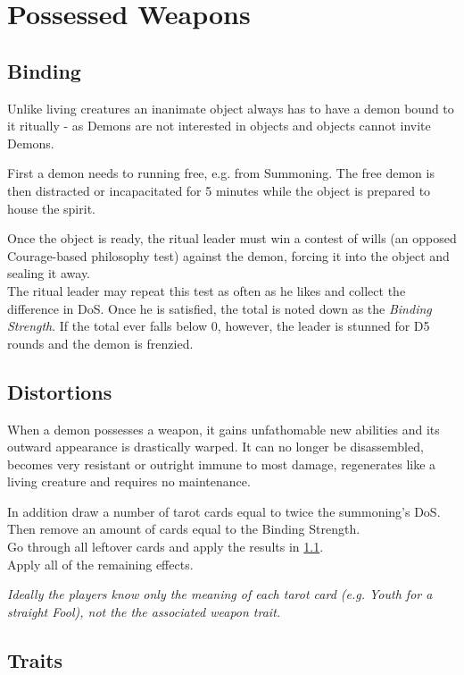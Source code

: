 \section{Possessed Weapons}
\label{sec:possessedweapon}
\subsection*{Binding}
Unlike living creatures an inanimate object always has to have a demon bound to it ritually
- as Demons are not interested in objects and objects cannot invite Demons.
\par
First a demon needs to running free, e.g. from Summoning.
The free demon is then distracted or incapacitated for 5 minutes while the object is prepared to house the spirit.
\par
Once the object is ready, the ritual leader must win a contest of wills
	(an opposed Courage-based philosophy test)
	against the demon, forcing it into the object and sealing it away.
\\%
The ritual leader may repeat this test as often as he likes and collect the difference in DoS.
Once he is satisfied, the total is noted down as the \emph{Binding Strength}.
If the total ever falls below 0, however, the leader is stunned for D5 rounds and the demon is frenzied.

\subsection*{Distortions}
When a demon possesses a weapon, it gains unfathomable new abilities and its outward appearance is drastically warped.
It can no longer be disassembled, becomes very resistant or outright immune to most damage, regenerates like a living creature and requires no maintenance.
\par
In addition draw a number of tarot cards equal to twice the summoning's DoS.
Then remove an amount of cards equal to the Binding Strength.\\
Go through all leftover cards and apply the results in \ref{sec:traits}.
\\%
Apply all of the remaining effects.
\begin{exampleblock}
	\itshape
	Ideally the players know only the meaning of each tarot card
	(e.g. \emph{Youth} for a straight Fool),
	not the the associated weapon trait.
\end{exampleblock}

\subsection{Traits}
\label{sec:traits}
